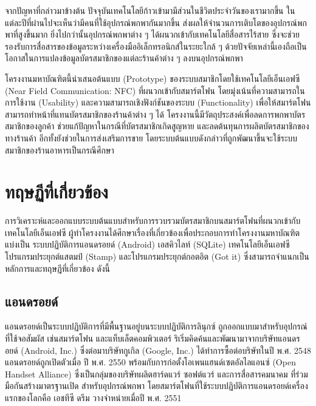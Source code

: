 \documentclass[a4paper]{article}
\begin{document}
จากปัญหาที่กล่าวมาข้างต้น ปัจจุบันเทคโนโลยีก้าวเข้ามามีส่วนในชีวิตประจำวันของเรามากขึ้น ในแต่ละปีที่ผ่านไปจะเห็นว่ามีคนที่ใช้อุปกรณ์พกพากันมากขึ้น ส่งผลให้จำนวนการเติบโตของอุปกรณ์พกพาที่สูงขึ้นมาก \cite{itm:shopping} ยิ่งไปกว่านั้นอุปกรณ์พกพาต่าง ๆ ได้ผนวกเข้ากับเทคโนโลยีสื่อสารไร้สาย ซึ่งจะช่วยรองรับการสื่อสารของข้อมูลระหว่างเครื่องมืออิเล็กทรอนิกส์ในระยะใกล้ ๆ \cite{itm:rpp-mobile} ด้วยปัจจัยเหล่านี้เองถือเป็นโอกาสในการแปลงข้อมูลบัตรสมาชิกของแต่ละร้านค้าต่าง ๆ ลงบนอุปกรณ์พกพา 

โครงงานมหาบัณฑิตนี้นำเสนอต้นแบบ (Prototype) ของระบบสมาชิกโดยใช้เทคโนโลยีเอ็นเอฟซี (Near Field Communication: NFC) ที่ผนวกเข้ากับสมาร์ตโฟน โดยมุ่งเน้นที่ความสามารถในการใช้งาน (Usability) และความสามารถเชิงฟังก์ชันของระบบ (Functionality) เพื่อให้สมาร์ตโฟนสามารถทำหน้าที่แทนบัตรสมาชิกของร้านค้าต่าง ๆ ได้ โครงงานนี้มีวัตถุประสงค์เพื่อลดการพกพาบัตรสมาชิกของลูกค้า ช่วยแก้ปัญหาในกรณีที่บัตรสมาชิกเกิดสูญหาย และลดต้นทุนการผลิตบัตรสมาชิกของทางร้านค้า อีกทั้งยังช่วยในการส่งเสริมการขาย โดยระบบต้นแบบดังกล่าวที่ถูกพัฒนาขึ้นจะใช้ระบบสมาชิกของร้านอาหารเป็นกรณีศึกษา

\section{ทฤษฏีที่เกี่ยวข้อง}
การวิเคราะห์และออกแบบระบบต้นแบบสำหรับการรวบรวมบัตรสมาชิกบนสมาร์ตโฟนที่ผนวกเข้ากับเทคโนโลยีเอ็นเอฟซี ผู้ทำโครงงานได้ศึกษาเรื่องที่เกี่ยวข้องเพื่อประกอบการทําโครงงานมหาบัณฑิต แบ่งเป็น ระบบปฏิบัติการแอนดรอยด์ (Android) เอสคิวไลท์ (SQLite) เทคโนโลยีเอ็นเอฟซี โปรแกรมประยุกต์แสตมป์ (Stamp) และโปรแกรมประยุกต์กอตอิต (Got it) ซึ่งสามารถจําแนกเป็นหลักการและทฤษฎีที่เกี่ยวข้อง ดังนี้

\subsection{แอนดรอยด์}
แอนดรอยด์เป็นระบบปฏิบัติการที่มีพื้นฐานอยู่บนระบบปฏิบัติการลินุกซ์ ถูกออกแบบมาสำหรับอุปกรณ์ที่ใช้จอสัมผัส เช่นสมาร์ตโฟน และแท็บเล็ตคอมพิวเตอร์ ริเริ่มคิดค้นและพัฒนามาจากบริษัทแอนดรอยด์ (Android, Inc.) ซึ่งต่อมาบริษัทกูเกิล (Google, Inc.) ได้ทำการซื้อต่อบริษัทในปี พ.ศ. 2548 แอนดรอยด์ถูกเปิดตัวเมื่อ ปี พ.ศ. 2550 พร้อมกับการก่อตั้งโอเพนแฮนด์เซตอัลไลแอนซ์ (Open Handset Alliance) ซึ่งเป็นกลุ่มของบริษัทผลิตฮาร์ดแวร์ ซอฟต์แวร์ และการสื่อสารคมนาคม ที่ร่วมมือกันสร้างมาตรฐานเปิด สำหรับอุปกรณ์พกพา โดยสมาร์ตโฟนที่ใช้ระบบปฏิบัติการแอนดรอยด์เครื่องแรกของโลกคือ เอชทีซี ดรีม วางจำหน่ายเมื่อปี พ.ศ. 2551
\end{document}
